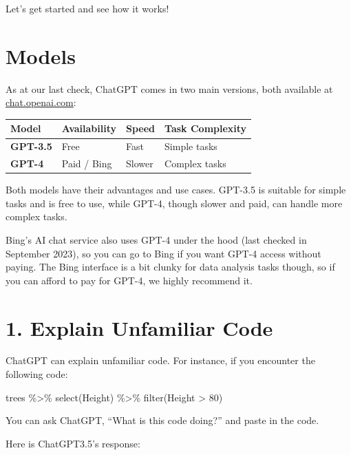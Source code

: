 \documentclass[
  letterpaper,
  DIV=11,
  numbers=noendperiod]{scrreprt}
\newenvironment{Shaded}{\begin{snugshade}}{\end{snugshade}}
\newcommand{\DecValTok}[1]{\textcolor[rgb]{0.68,0.00,0.00}{#1}}
\newcommand{\FunctionTok}[1]{\textcolor[rgb]{0.28,0.35,0.67}{#1}}
\newcommand{\NormalTok}[1]{\textcolor[rgb]{0.00,0.23,0.31}{#1}}
\newcommand{\SpecialCharTok}[1]{\textcolor[rgb]{0.37,0.37,0.37}{#1}}
\begin{document}
Let's get started and see how it works!

\section{Models}\label{models}

As at our last check, ChatGPT comes in two main versions, both available
at \href{https://chat.openai.com}{chat.openai.com}:

\begin{longtable}[]{@{}llll@{}}
\toprule\noalign{}
Model & Availability & Speed & Task Complexity \\
\midrule\noalign{}
\endhead
\bottomrule\noalign{}
\endlastfoot
\textbf{GPT-3.5} & Free & Fast & Simple tasks \\
\textbf{GPT-4} & Paid / Bing & Slower & Complex tasks \\
\end{longtable}

Both models have their advantages and use cases. GPT-3.5 is suitable for
simple tasks and is free to use, while GPT-4, though slower and paid,
can handle more complex tasks.

Bing's AI chat service also uses GPT-4 under the hood (last checked in
September 2023), so you can go to Bing if you want GPT-4 access without
paying. The Bing interface is a bit clunky for data analysis tasks
though, so if you can afford to pay for GPT-4, we highly recommend it.

\section{1. Explain Unfamiliar Code}\label{explain-unfamiliar-code}

ChatGPT can explain unfamiliar code. For instance, if you encounter the
following code:

\begin{Shaded}
\begin{Highlighting}[]
\NormalTok{trees }\SpecialCharTok{\%\textgreater{}\%}
  \FunctionTok{select}\NormalTok{(Height) }\SpecialCharTok{\%\textgreater{}\%} 
  \FunctionTok{filter}\NormalTok{(Height }\SpecialCharTok{\textgreater{}} \DecValTok{80}\NormalTok{)}
\end{Highlighting}
\end{Shaded}

You can ask ChatGPT, ``What is this code doing?'' and paste in the code.

Here is ChatGPT3.5's response:
\end{document}
